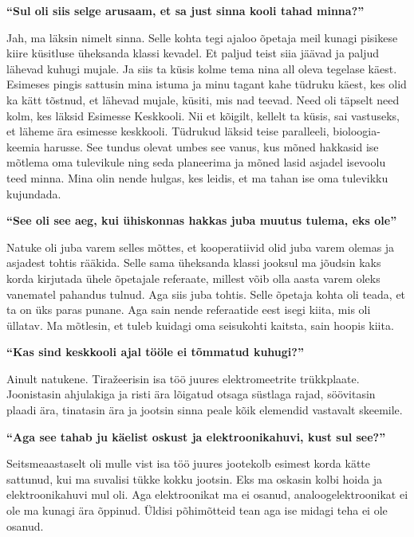 \textbf{\enquote{Sul oli siis selge arusaam, et sa just sinna kooli tahad
minna?}}

Jah, ma läksin nimelt sinna. Selle kohta tegi ajaloo õpetaja meil kunagi
pisikese kiire küsitluse üheksanda klassi kevadel. Et paljud teist siia jäävad
ja paljud lähevad kuhugi mujale. Ja siis ta küsis kolme tema nina all oleva
tegelase käest. Esimeses pingis sattusin mina istuma ja minu tagant kahe
tüdruku käest, kes olid ka kätt tõstnud, et lähevad mujale, küsiti, mis nad
teevad. Need oli täpselt need kolm, kes läksid Esimesse Keskkooli. Nii et kõigilt,
kellelt ta küsis, sai vastuseks, et läheme ära esimesse keskkooli. Tüdrukud läksid
teise paralleeli, bioloogia-keemia harusse. See tundus olevat umbes see vanus,
kus mõned hakkasid ise mõtlema oma tulevikule ning seda planeerima ja mõned
lasid asjadel isevoolu teed minna. Mina olin nende hulgas, kes leidis, et ma
tahan ise oma tulevikku kujundada.

\textbf{\enquote{See oli see aeg, kui ühiskonnas hakkas juba muutus tulema, eks
ole}}

Natuke oli juba varem selles mõttes, et kooperatiivid olid juba varem olemas
ja asjadest tohtis rääkida. Selle sama üheksanda klassi jooksul ma jõudsin kaks
korda kirjutada ühele õpetajale referaate, millest võib olla aasta varem oleks
vanematel pahandus tulnud. Aga siis juba tohtis. Selle õpetaja kohta oli teada,
et ta on üks paras punane. Aga sain nende referaatide eest isegi kiita, mis oli
üllatav. Ma mõtlesin, et tuleb kuidagi oma seisukohti kaitsta, sain hoopis
kiita.

\textbf{\enquote{Kas sind keskkooli ajal tööle ei tõmmatud kuhugi?}}

Ainult natukene. Tiražeerisin isa töö juures elektromeetrite trükkplaate.
Joonistasin ahjulakiga ja risti ära lõigatud otsaga süstlaga rajad, söövitasin
plaadi ära, tinatasin ära ja jootsin sinna peale kõik elemendid vastavalt
skeemile.

\textbf{\enquote{Aga see tahab ju käelist oskust ja elektroonikahuvi, kust sul
see?}}

Seitsmeaastaselt oli mulle vist isa töö juures jootekolb esimest korda kätte
sattunud, kui ma suvalisi tükke kokku jootsin. Eks ma oskasin kolbi hoida ja
elektroonikahuvi mul oli. Aga elektroonikat ma ei osanud, analoogelektroonikat
ei ole ma kunagi ära õppinud. Üldisi põhimõtteid tean aga ise midagi teha ei
ole osanud.

